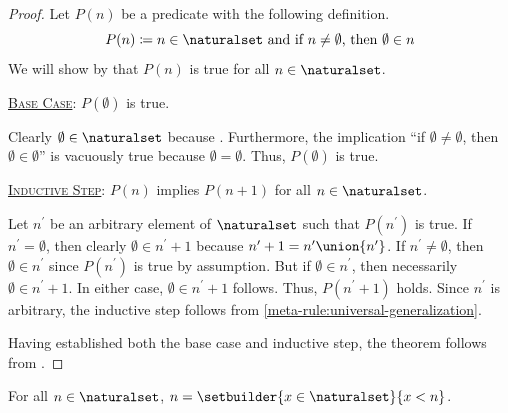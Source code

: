 \begin{proof}
    Let \( P(n) \) be a predicate with the following definition.
    \begin{equation*}
        P(n) \coloneq  \text{\( n \in \naturalset \) and if \( n \neq \emptyset \), then \( \emptyset \in n \)}
    \end{equation*}
    We will show by  that \( P(n) \) is true for all \( n \in \naturalset \).

    \vspace{0.3cm}
    \noindent
    \underline{\scshape Base Case}: \( P(\emptyset) \) is true.

    \vspace{0.3cm}
    \noindent
    Clearly \( \emptyset \in \naturalset \) because .
    Furthermore, the implication ``if \( \emptyset \neq \emptyset \), then \( \emptyset \in \emptyset \)'' is vacuously true because \( \emptyset = \emptyset \).
    Thus, \( P(\emptyset) \) is true.

    \vspace{0.3cm}
    \noindent
    \underline{\scshape Inductive Step}: \( P(n) \) implies \( P(n + 1) \) for all \( n \in \naturalset \).

    \vspace{0.3cm}
    \noindent
    Let \( n^{\prime} \) be an arbitrary element of \( \naturalset \) such that \( P(n^{\prime}) \) is true.
    If \( n^{\prime} = \emptyset \), then clearly \( \emptyset \in n^{\prime} + 1 \) because \( n^{\prime} + 1 = n^{\prime} \union \mleft\{ n^{\prime} \mright\} \).
    If \( n^{\prime} \neq \emptyset \), then \( \emptyset \in n^{\prime} \) since \( P(n^{\prime}) \) is true by assumption.
    But if \( \emptyset \in n^{\prime} \), then necessarily \( \emptyset \in n^{\prime} + 1 \).
    In either case, \( \emptyset \in n^{\prime} + 1 \) follows.
    Thus, \( P(n^{\prime} + 1) \) holds.
    Since \( n^{\prime} \) is arbitrary, the inductive step follows from \cref{meta-rule:universal-generalization}.

    \vspace{0.3cm}
    \noindent
    Having established both the base case and inductive step, the theorem follows from .
\end{proof}

\begin{thm}
     \label{thm:metatheory-every-natural-number-is-the-set-of-all-elements-of-N-that-is-less-than-itself}
    For all \( n \in \naturalset \), \( n = \setbuilder{x \in \naturalset}{x < n} \).
\end{thm}

